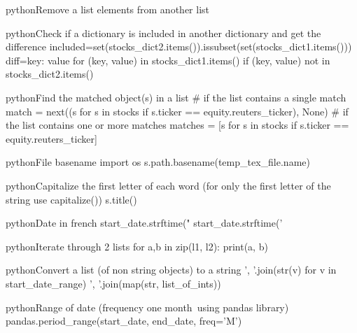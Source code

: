 \documentclass[10pt,a4paper]{article}
\begin{document}
\begin{multicols}{3}
\begin{codebox}{python}{Remove a list elements from another list}
\end{codebox}

\begin{codebox}{python}{Check if a dictionary is included in another dictionary and get the difference}
included=set(stocks_dict2.items()).issubset(set(stocks_dict1.items()))
diff={key: value for (key, value) in stocks_dict1.items() 
    if (key, value) not in stocks_dict2.items()}

\end{codebox}

\begin{codebox}{python}{Find the matched object(s) in a list}
# if the list contains a single match
match = next((s for s in stocks if s.ticker == equity.reuters_ticker), None)
# if the list contains one or more matches
matches = [s for s in stocks if s.ticker == equity.reuters_ticker]

\end{codebox}

\begin{codebox}{python}{File basename}
import os
s.path.basename(temp_tex_file.name)

\end{codebox}

\begin{codebox}{python}{Capitalize the first letter of each word (for only the first letter of the string use capitalize())}
s.title()

\end{codebox}

\begin{codebox}{python}{Date in french}
start_date.strftime("%
start_date.strftime('%

\end{codebox}

\begin{codebox}{python}{Iterate through 2 lists}
for a,b in zip(l1, l2):
        print(a, b)

\end{codebox}

\begin{codebox}{python}{Convert a list (of non string objects) to a string}
', '.join(str(v) for v in start_date_range)
', '.join(map(str, list_of_ints))

\end{codebox}

\begin{codebox}{python}{Range of date (frequency one month\, using pandas library)}
pandas.period_range(start_date, end_date, freq='M')


\end{codebox}
\end{multicols}
\end{document}
